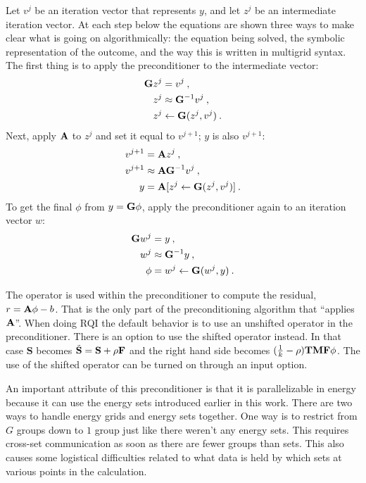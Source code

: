 Let $v^{j}$ be an iteration vector that represents $y$, and let $z^{j}$ be an intermediate iteration vector. At each step below the equations are shown three ways to make clear what is going on algorithmically: the equation being solved, the symbolic representation of the outcome, and the way this is written in multigrid syntax. The first thing is to apply the preconditioner to the intermediate vector: %
%
\begin{align}
  \mathbf{G}z^{j} &= v^{j} \:,  \label{eq:invertG} \\
  z^{j} &\approx \mathbf{G}^{-1}v^{j} \:, \nonumber \\
  z^{j} &\leftarrow \mathbf{G}(z^{j}, v^{j}) \:. \nonumber
\end{align}
%
Next, apply $\mathbf{A}$ to $z^{j}$ and set it equal to $v^{j+1}$; $y$ is also $v^{j+1}$:
\begin{align}
  v^{j+1} &= \mathbf{A}z^{j} \:,   \label{eq:ApplyA} \\
  v^{j+1} &\approx \mathbf{AG}^{-1}v^{j} \:, \nonumber \\
  y &= \mathbf{A}[z^{j} \leftarrow \mathbf{G}(z^{j}, v^{j})] \:. \nonumber
\end{align}
%
To get the final $\phi$ from $y = \mathbf{G}\phi$, apply the preconditioner again to an iteration vector $w$:
%
\begin{align}
  \mathbf{G}w^{j} &= y \:,   \label{eq:findPhi} \\
  w^{j} &\approx \mathbf{G}^{-1}y \:, \nonumber \\
  \phi &= w^{j} \leftarrow \mathbf{G}(w^{j}, y) \:. \nonumber
\end{align}

The operator is used within the preconditioner to compute the residual, $r = \mathbf{A}\phi - b$. That is the only part of the preconditioning algorithm that ``applies $\mathbf{A}$''.  When doing RQI the default behavior is to use an unshifted operator in the preconditioner. There is an option to use the shifted operator instead. In that case $\mathbf{S}$ becomes $\tilde{\mathbf{S}} = \mathbf{S} + \rho\mathbf{F}$ and the right hand side becomes $(\frac{1}{k} - \rho)\mathbf{TMF}\phi$. The use of the shifted operator can be turned on through an input option.

An important attribute of this preconditioner is that it is parallelizable in energy because it can use the energy sets introduced earlier in this work. There are two ways to handle energy grids and energy sets together. One way is to restrict from $G$ groups down to $1$ group just like there weren't any energy sets. This requires cross-set communication as soon as there are fewer groups than sets. This also causes some logistical difficulties related to what data is held by which sets at various points in the calculation. 

